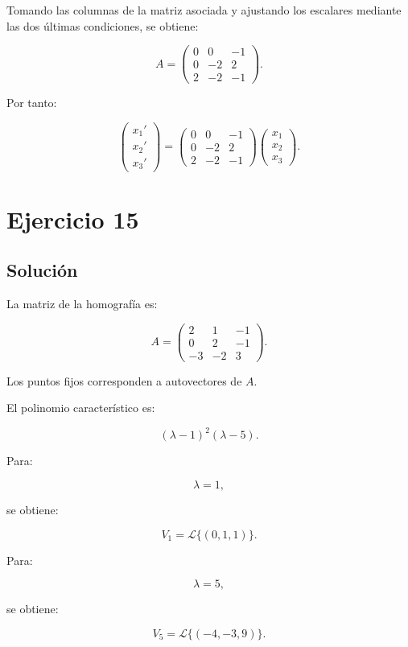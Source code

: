 \documentclass[11pt,a4paper]{article}
\begin{document}
Tomando las columnas de la matriz asociada y ajustando los escalares mediante las dos últimas condiciones, se obtiene:

\[
A=
\begin{pmatrix}
0&0&-1\\
0&-2&2\\
2&-2&-1
\end{pmatrix}.
\]

Por tanto:

\[
\boxed{
\begin{pmatrix}
x_1'\\x_2'\\x_3'
\end{pmatrix}
=
\begin{pmatrix}
0&0&-1\\
0&-2&2\\
2&-2&-1
\end{pmatrix}
\begin{pmatrix}
x_1\\x_2\\x_3
\end{pmatrix}.
}
\]

\section{Ejercicio 15}
\subsection{Solución}

La matriz de la homografía es:

\[
A=
\begin{pmatrix}
2&1&-1\\
0&2&-1\\
-3&-2&3
\end{pmatrix}.
\]

Los puntos fijos corresponden a autovectores de \(A\).

El polinomio característico es:

\[
(\lambda-1)^2(\lambda-5).
\]

Para:

\[
\lambda=1,
\]

se obtiene:

\[
V_1=\mathcal L\{(0,1,1)\}.
\]

Para:

\[
\lambda=5,
\]

se obtiene:

\[
V_5=\mathcal L\{(-4,-3,9)\}.
\]
\end{document}
